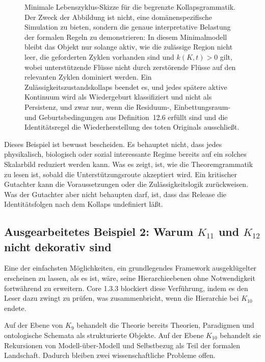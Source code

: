\begin{figure}[htbp]
\centering

\caption{Minimale Lebenszyklus-Skizze für die begrenzte Kollapsgrammatik. Der Zweck der Abbildung ist nicht,
eine domänenspezifische Simulation zu bieten, sondern die genaue interpretative Belastung der formalen Regeln zu
demonstrieren: In diesem Minimalmodell bleibt das Objekt nur solange aktiv, wie die zulässige Region nicht leer,
die geforderten Zyklen vorhanden sind und \(k(K,t)>0\) gilt, wobei unterstützende Flüsse nicht durch
zerstörende Flüsse auf den relevanten Zyklen dominiert werden. Ein Zulässigkeitszustandskollaps beendet es,
und jedes spätere aktive Kontinuum wird als Wiedergeburt klassifiziert und nicht als Persistenz, und zwar nur,
wenn die Residuum-, Einbettungsraum- und Geburtsbedingungen aus Definition~12.6 erfüllt sind und die
Identitätsregel die Wiederherstellung des toten Originals ausschließt.}
\label{fig:oc13-birth-life-death}
\end{figure}

Dieses Beispiel ist bewusst bescheiden. Es behauptet nicht, dass jedes physikalisch,
biologisch oder sozial interessante Regime bereits auf ein solches Skalarbild reduziert werden kann. Was es
zeigt, ist, wie die Theoremgrammatik zu lesen ist, sobald die Unterstützungsroute akzeptiert wird. Ein
kritischer Gutachter kann die Voraussetzungen oder die Zulässigkeitslogik zurückweisen. Was der Gutachter
aber nicht behaupten darf, ist, dass das Release die Identitätsfolgen nach dem Kollaps undefiniert läßt.

\subsection{Ausgearbeitetes Beispiel 2: Warum \texorpdfstring{$K_{11}$}{K11} und \texorpdfstring{$K_{12}$}{K12} nicht dekorativ sind}

Eine der einfachsten Möglichkeiten, ein grundlegendes Framework ausgeklügelter erscheinen zu lassen, als es
ist, wäre, seine Hierarchieebenen ohne Notwendigkeit fortwährend zu erweitern. Core 1.3.3 blockiert diese
Verführung, indem es den Leser dazu zwingt zu prüfen, was zusammenbricht, wenn die Hierarchie bei
\(K_{10}\) endete.

Auf der Ebene von \(K_9\) behandelt die Theorie bereits Theorien, Paradigmen und ontologische Schemata als
strukturierte Objekte. Auf der Ebene \(K_{10}\) behandelt sie Rekursionen von Modell-über-Modell und
Selbstbezug als Teil der formalen Landschaft. Dadurch bleiben zwei wissenschaftliche Probleme offen.

